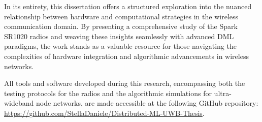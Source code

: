In its entirety, this dissertation offers a structured exploration into the nuanced relationship between hardware and computational strategies in the wireless communication domain. By presenting a comprehensive study of the Spark SR1020 radios and weaving these insights seamlessly with advanced DML paradigms, the work stands as a valuable resource for those navigating the complexities of hardware integration and algorithmic advancements in wireless networks.

All tools and software developed during this research, encompassing both the testing protocols for the radios and the algorithmic simulations for ultra-wideband node networks, are made accessible at the following GitHub repository: \url{https://github.com/StellaDaniele/Distributed-ML-UWB-Thesis}.
\newpage



